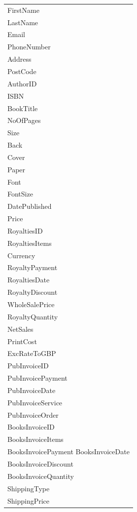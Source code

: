 \begin{tabular}{|p{3.5cm}|}
    \hline
    FirstName \\
    LastName \\
    Email \\
    PhoneNumber \\
    Address \\
    PostCode \\
    AuthorID \\
    ISBN \\
    BookTitle \\
    NoOfPages \\
    Size \\
    Back \\
    Cover \\
    Paper \\
    Font \\
    FontSize \\
    DatePublished \\
    Price \\
    RoyaltiesID \\
    RoyaltiesItems \\
    Currency \\
    RoyaltyPayment \\
    RoyaltiesDate \\
    RoyaltyDiscount \\
    WholeSalePrice \\
    RoyaltyQuantity \\
    NetSales \\
    PrintCost \\
    ExcRateToGBP \\
    PubInvoiceID \\
    PubInvoicePayment \\
    PubInvoiceDate \\
    PubInvoiceService \\
    PubInvoiceOrder \\
    BooksInvoiceID \\
    BooksInvoiceItems \\
    BooksInvoicePayment
    BooksInvoiceDate \\
    BooksInvoiceDiscount \\
    BooksInvoiceQuantity \\
    ShippingType \\
    ShippingPrice \\
    \hline
\end{tabular}


